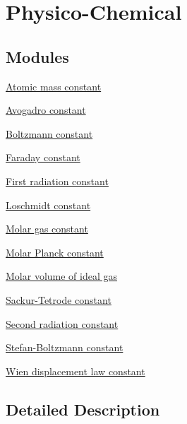 \hypertarget{group___physico_chemical}{}\section{Physico-\/\+Chemical}
\label{group___physico_chemical}
\subsection*{Modules}
\begin{DoxyCompactItemize}
\item 
\hyperlink{group___atomic_mass_constant}{Atomic mass constant}
\item 
\hyperlink{group___avogadro_constant}{Avogadro constant}
\item 
\hyperlink{group___boltzmann_constant}{Boltzmann constant}
\item 
\hyperlink{group___faraday_constant}{Faraday constant}
\item 
\hyperlink{group___first_radiation_constant}{First radiation constant}
\item 
\hyperlink{group___loschmidt_constant}{Loschmidt constant}
\item 
\hyperlink{group___molar_gas_constant}{Molar gas constant}
\item 
\hyperlink{group___molar_planck_constant}{Molar Planck constant}
\item 
\hyperlink{group___molar_volume}{Molar volume of ideal gas}
\item 
\hyperlink{group___sackur_tetrode_constant}{Sackur-\/\+Tetrode constant}
\item 
\hyperlink{group___second_radiation_constant}{Second radiation constant}
\item 
\hyperlink{group___stefan_boltzmann_constant}{Stefan-\/\+Boltzmann constant}
\item 
\hyperlink{group___wien_displacement}{Wien displacement law constant}
\end{DoxyCompactItemize}


\subsection{Detailed Description}

